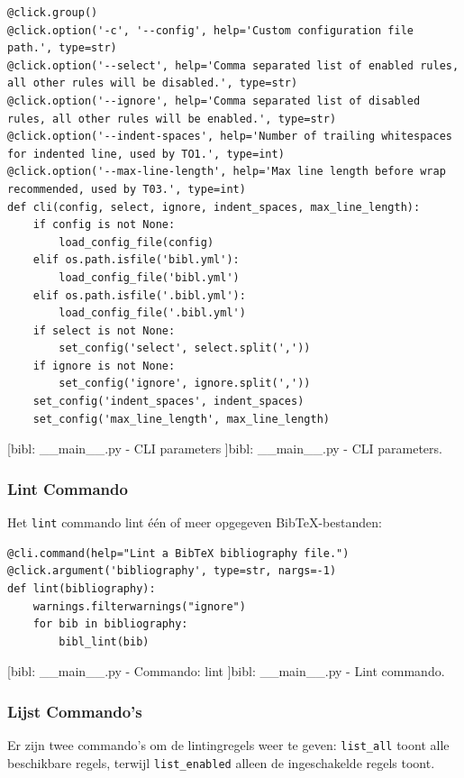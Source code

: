 \begin{verbatim}
@click.group()
@click.option('-c', '--config', help='Custom configuration file path.', type=str)
@click.option('--select', help='Comma separated list of enabled rules, all other rules will be disabled.', type=str)
@click.option('--ignore', help='Comma separated list of disabled rules, all other rules will be enabled.', type=str)
@click.option('--indent-spaces', help='Number of trailing whitespaces for indented line, used by TO1.', type=int)
@click.option('--max-line-length', help='Max line length before wrap recommended, used by T03.', type=int)
def cli(config, select, ignore, indent_spaces, max_line_length):
    if config is not None:
        load_config_file(config)
    elif os.path.isfile('bibl.yml'):
        load_config_file('bibl.yml')
    elif os.path.isfile('.bibl.yml'):
        load_config_file('.bibl.yml')
    if select is not None:
        set_config('select', select.split(','))
    if ignore is not None:
        set_config('ignore', ignore.split(','))
    set_config('indent_spaces', indent_spaces)
    set_config('max_line_length', max_line_length)
\end{verbatim}
[bibl: \_\_main\_\_.py - \acrshort{CLI} parameters ]{bibl: \_\_main\_\_.py - \acrshort{CLI} parameters. \label{lst:bibl_main_cli}}

\subsubsection{Lint Commando}

Het \texttt{lint} commando lint één of meer opgegeven BibTeX-bestanden:

\begin{verbatim}
@cli.command(help="Lint a BibTeX bibliography file.")
@click.argument('bibliography', type=str, nargs=-1)
def lint(bibliography):
    warnings.filterwarnings("ignore")
    for bib in bibliography:
        bibl_lint(bib)
\end{verbatim}
[bibl: \_\_main\_\_.py - Commando: lint ]{bibl: \_\_main\_\_.py - Lint commando. \label{lst:bibl_main_lint_command}}

\subsubsection{Lijst Commando's}

Er zijn twee commando's om de lintingregels weer te geven: \texttt{list\_all} toont alle beschikbare regels, terwijl \texttt{list\_enabled} alleen de ingeschakelde regels toont.

